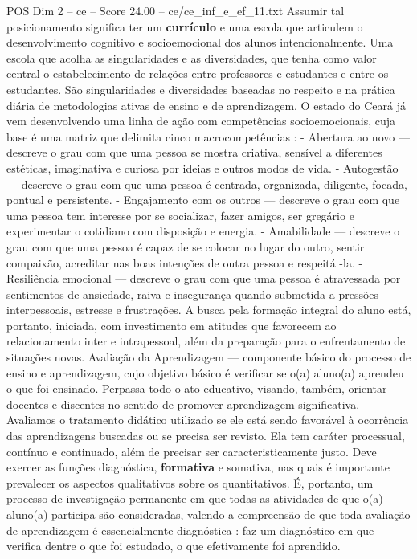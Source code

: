 \begin{textsample}{POS Dim 2 – ce – Score 24.00 – ce/ce\_inf\_e\_ef\_11.txt}
Assumir tal posicionamento significa ter um \textbf{currículo} e uma escola que articulem o desenvolvimento cognitivo e socioemocional dos alunos intencionalmente.
Uma escola que acolha as singularidades e as diversidades, que tenha como valor central o estabelecimento de relações entre professores e estudantes e entre os estudantes.
São singularidades e diversidades baseadas no respeito e na prática diária de metodologias ativas de ensino e de aprendizagem.
O estado do Ceará já vem desenvolvendo uma linha de ação com competências socioemocionais, cuja base é uma matriz que delimita cinco macrocompetências : - Abertura ao novo — descreve o grau com que uma pessoa se mostra criativa, sensível a diferentes estéticas, imaginativa e curiosa por ideias e outros modos de vida. - Autogestão — descreve o grau com que uma pessoa é centrada, organizada, diligente, focada, pontual e persistente. - Engajamento com os outros — descreve o grau com que uma pessoa tem interesse por se socializar, fazer amigos, ser gregário e experimentar o cotidiano com disposição e energia. - Amabilidade — descreve o grau com que uma pessoa é capaz de se colocar no lugar do outro, sentir compaixão, acreditar nas boas intenções de outra pessoa e respeitá -la. - Resiliência emocional — descreve o grau com que uma pessoa é atravessada por sentimentos de ansiedade, raiva e insegurança quando submetida a pressões interpessoais, estresse e frustrações.
A busca pela formação integral do aluno está, portanto, iniciada, com investimento em atitudes que favorecem ao relacionamento inter e intrapessoal, além da preparação para o enfrentamento de situações novas.
Avaliação da Aprendizagem — componente básico do processo de ensino e aprendizagem, cujo objetivo básico é verificar se o(a) aluno(a) aprendeu o que foi ensinado.
Perpassa todo o ato educativo, visando, também, orientar docentes e discentes no sentido de promover aprendizagem significativa.
Avaliamos o tratamento didático utilizado se ele está sendo favorável à ocorrência das aprendizagens buscadas ou se precisa ser revisto.
Ela tem caráter processual, contínuo e continuado, além de precisar ser caracteristicamente justo.
Deve exercer as funções diagnóstica, \textbf{formativa} e somativa, nas quais é importante prevalecer os aspectos qualitativos sobre os quantitativos.
É, portanto, um processo de investigação permanente em que todas as atividades de que o(a) aluno(a) participa são consideradas, valendo a compreensão de que toda avaliação de aprendizagem é essencialmente diagnóstica : faz um diagnóstico em que verifica dentre o que foi estudado, o que efetivamente foi aprendido.

\end{textsample}

